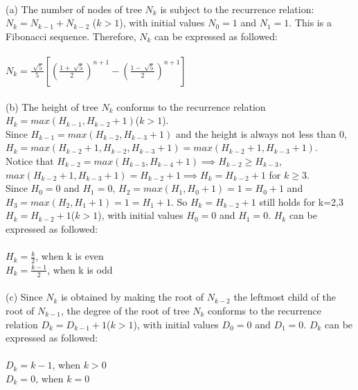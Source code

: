 \begin{problem}{1} ~\\
(a) The number of nodes of tree $N_k$ is subject to the recurrence relation: $N_k = N_{k-1} + N_{k-2}$
($k > 1$), with initial values $N_0 = 1$ and $N_1 = 1$. This is a Fibonacci sequence. Therefore, $N_k$ can be expressed as followed:\\
\\
\tab\tab\tab\tab\tab $N_k = \frac{\sqrt[]{5}}{5}[(\frac{1 + \sqrt[]{5}}{2})^{n+1} - (\frac{1 - \sqrt[]{5}}{2})^{n+1}]$\\
\\
(b) The height of tree $N_k$ conforms to the recurrence relation  $H_k = max(H_{k-1}, H_{k-2} + 1)$($k > 1$). \\
Since  $H_{k-1} = max(H_{k-2}, H_{k-3} + 1)$ and the height is always not less than 0, $H_k = max(H_{k-2} + 1, H_{k-2}, H_{k-3} + 1) = max(H_{k-2} + 1, H_{k-3} + 1)$. \\
Notice that $H_{k-2} = max(H_{k-3}, H_{k-4} + 1) \implies H_{k-2} \geq H_{k-3}$, $max(H_{k-2} + 1, H_{k-3} + 1)= H_{k-2} + 1 \implies H_k = H_{k-2} + 1$ for $k \geq 3$.\\
 Since $H_0 = 0$ and $H_1 = 0$, $H_2 = max(H_{1}, H_{0} + 1) = 1 = H_{0} + 1 $ and $H_3 = max(H_{2}, H_{1} + 1) = 1 = H_{1} + 1 $. So $H_k = H_{k-2} + 1$ still holds for k=2,3\\ 
$H_k = H_{k-2} + 1$($k > 1$), with initial values $H_0 = 0$ and $H_1 = 0$. $H_k$ can be expressed as followed:\\
\\
\tab\tab\tab\tab\tab\tab $H_k = \frac{k}{2}$, when k is even\\
\tab\tab\tab\tab\tab\tab $H_k = \frac{k-1}{2}$, when k is odd\\
\\
(c) Since $N_k$ is obtained by making the root of $N_{k-2}$ the leftmost child of the root of $N_{k-1}$, the degree of the root of tree $N_k$ conforms to the recurrence relation $D_k = D_{k-1} + 1$($k > 1$), with initial values $D_0 = 0$ and $D_1 = 0$. $D_k$ can be expressed as followed:\\
\\
\tab\tab\tab\tab\tab\tab\tab $D_k = k - 1$, when $k > 0$\\
\tab\tab\tab\tab\tab\tab\tab $D_k = 0$, when $k = 0$\\
\end{problem}